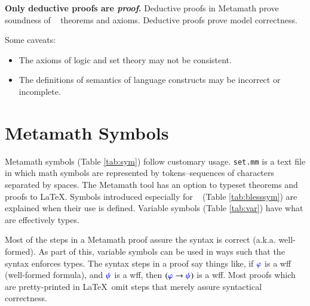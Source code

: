 \pn \textbf{Only deductive proofs are \textit{proof}.}  Deductive proofs in Metamath prove soundness of \lang~ theorems and axioms.  Deductive proofs prove model correctness.

\pn Some caveats:
\begin{itemize}
\item The axioms of logic and set theory may not be consistent.
\item The definitions of semantics of language constructs may be incorrect or incomplete.
\end{itemize}

%

\section{Metamath Symbols}\label{sec:metamathsymbols}

\pn Metamath symbols (Table \ref{tab:sym}) follow customary usage.  \texttt{set.mm} is a text file in which math symbols are represented by tokens--sequences of characters separated by spaces.  The Metamath tool has an option to typeset theorems and proofs to \LaTeX.  
Symbols introduced especially for \lang~ (Table \ref{tab:blesssym}) are explained when their use is defined.  Variable symbols (Table \ref{tab:var}) have what are effectively types.

\pn Most of the steps in a Metamath proof assure the syntax is correct (a.k.a. well-formed).  As part of this, variable symbols can be used in ways such that the syntax enforces types.  The syntax steps in a proof say things like, if $\mw{\varphi}$ is a wff (well-formed formula), and $\mw{\psi}$ is a wff, then $(\mw{\varphi}\rightarrow\mw{\psi} )$ is a wff.
Most proofs which are pretty-printed in \LaTeX~omit steps that merely assure syntactical correctness.


